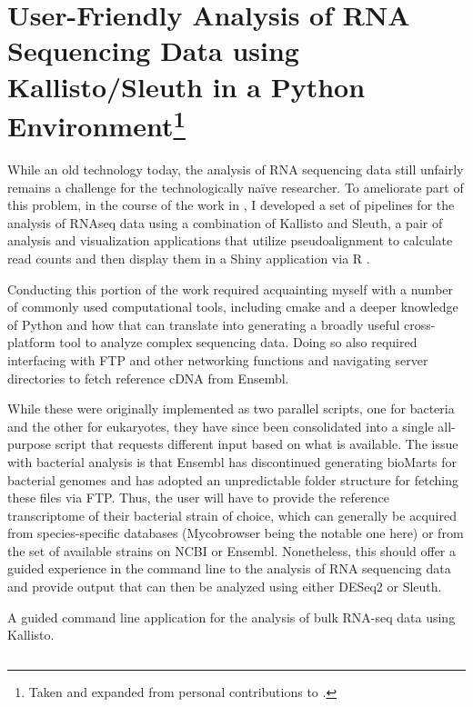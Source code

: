 \section[User-Friendly Analysis of RNA Sequencing Data using Kallisto/Sleuth in a Python Environment]{User-Friendly Analysis of RNA Sequencing Data using Kallisto/Sleuth in a Python Environment\footnote{Taken and expanded from personal contributions to \citet{Saelens2022}.}}\label{rnaseq}

While an old technology today, the analysis of RNA sequencing data still unfairly remains a challenge for the technologically na\"{i}ve researcher. To ameliorate part of this problem, in the course of the work in \citet{Saelens2022}, I developed a set of pipelines for the analysis of RNAseq data using a combination of Kallisto and Sleuth, a pair of analysis and visualization applications that utilize pseudoalignment to calculate read counts and then display them in a Shiny application via R \citep{Pimentel2017}.

Conducting this portion of the work required acquainting myself with a number of commonly used computational tools, including cmake and a deeper knowledge of Python and how that can translate into generating a broadly useful cross-platform tool to analyze complex sequencing data. Doing so also required interfacing with FTP and other networking functions and navigating server directories to fetch reference cDNA from Ensembl.

While these were originally implemented as two parallel scripts, one for bacteria and the other for eukaryotes, they have since been consolidated into a single all-purpose script that requests different input based on what is available. The issue with bacterial analysis is that Ensembl has discontinued generating bioMarts for bacterial genomes and has adopted an unpredictable folder structure for fetching these files via FTP. Thus, the user will have to provide the reference transcriptome of their bacterial strain of choice, which can generally be acquired from species-specific databases (Mycobrowser being the notable one here) or from the set of available strains on NCBI or Ensembl. Nonetheless, this should offer a guided experience in the command line to the analysis of RNA sequencing data and provide output that can then be analyzed using either DESeq2 or Sleuth.

\begin{code}
\caption{A guided command line application for the analysis of bulk RNA-seq data using Kallisto.}
\label{blinder}

\inputminted[breaklines,frame=single,fontsize=\small]{python}{source/allKallisto.py}

\end{code}

